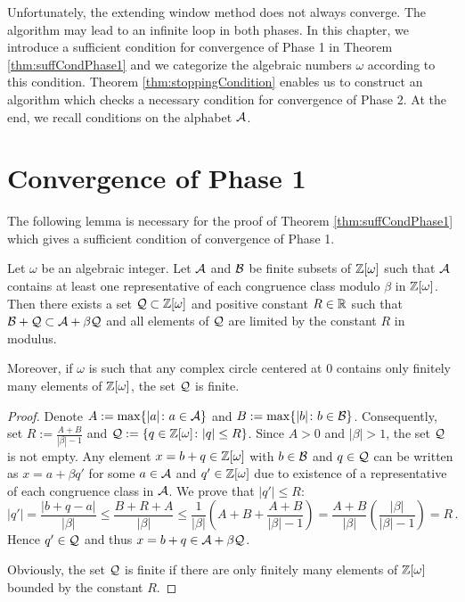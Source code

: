 Unfortunately, the extending window method does not always converge. The algorithm may lead to an infinite loop in both phases. 
In this chapter, we introduce a sufficient condition for convergence of Phase 1 in Theorem \ref{thm:suffCondPhase1} and we categorize the algebraic numbers $\omega$ according to this condition. Theorem \ref{thm:stoppingCondition} enables us to construct an algorithm which checks a necessary condition for convergence of Phase 2. At the end, we recall conditions on the alphabet $\mathcal{A}$. 

\section{Convergence of Phase 1}
\label{sec:convergencePhase1}
The following lemma is necessary for the proof of Theorem \ref{thm:suffCondPhase1} which gives a sufficient condition of convergence of Phase 1.
\begin{lem}
\label{lem:suffCondPhase1}
    Let $\omega$ be an algebraic integer. Let $\mathcal{A}$ and $\mathcal{B}$ be finite subsets of $\mathbb{Z}[\omega]$ such that $\mathcal{A}$ contains at least one representative of each congruence class modulo $\beta$ in $\mathbb{Z}[\omega]$. Then there exists a set $\mathcal{Q}\subset\mathbb{Z}[\omega]$ and positive constant $R\in \mathbb{R}$ such that $ \mathcal{B} + \mathcal{Q} \subset \mathcal{A} + \beta \mathcal{Q}$ and all elements of $\mathcal{Q}$ are limited by the constant $R$ in modulus.
    
    Moreover, if $\omega$ is such that any complex circle centered at 0 contains only finitely  many elements of $\mathbb{Z}[\omega]$, the set $\mathcal{Q}$ is finite. 

\end{lem}

\begin{proof}
 Denote $A:=\max\{|a|\colon a \in \mathcal{A}\}$ and $B:=\max\{|b|\colon b\in\mathcal{B}\}$. Consequently, set $R:=\frac{A+B}{|\beta|-1}$ and $\mathcal{Q}:=\{q\in\mathbb{Z}[\omega]\colon |q|\leq R\}$. Since $A>0$ and $|\beta|>1$, the set $\mathcal{Q}$ is not empty. Any element $x=b+q \in \mathbb{Z}[\omega]$ with $b\in\mathcal{B}$ and $q\in\mathcal{Q}$ can be written as $x=a+\beta q'$ for some $a\in\mathcal{A}$  and $q'\in\mathbb{Z}[\omega]$ due to existence of a representative of each congruence class in $\mathcal{A}$. We prove that $|q'|\leq R$:
 $$
    |q'|=\frac{|b+q-a|}{|\beta|}\leq \frac{B+R+A}{|\beta|} \leq \frac{1}{|\beta|}\left(A+B+\frac{A+B}{|\beta|-1}\right)  =\frac{A+B}{|\beta|}\left(\frac{|\beta|}{|\beta|-1}\right)=R\,.
 $$ 
 Hence $q'\in\mathcal{Q}$ and thus  $x=b+q \in \mathcal{A} + \beta \mathcal{Q}$. 
 
 Obviously, the set $\mathcal{Q}$ is finite if there are only finitely many elements of $\mathbb{Z}[\omega]$ bounded by the constant $R$.
\end{proof}

